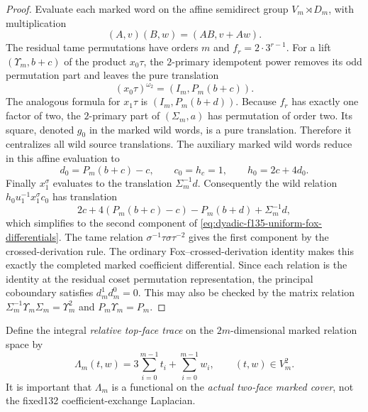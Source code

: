 \begin{proof}
Evaluate each marked
word on the affine
semidirect group
$V_m\rtimes D_m$,
with multiplication
\[
(A,v)(B,w)
=(AB,v+Aw).
\]
The residual tame
permutations have
orders $m$ and
$f_r=2\cdot3^{r-1}$.
For a lift
$(\Upsilon_m,b+c)$
of the product
$x_0\tau$,
the $2$-primary
idempotent power
removes its
odd permutation
part and leaves
the pure translation
\[
(x_0\tau)^{\omega_2}
=(I_m,P_m(b+c)).
\]
The analogous formula
for $x_1\tau$ is
$(I_m,P_m(b+d))$.
Because
$f_r$ has exactly
one factor of two,
the $2$-primary
part of
$(\Sigma_m,a)$
has permutation
of order two.
Its square,
denoted $g_0$ in
the marked wild
words, is a pure
translation.
Therefore it
centralizes all
wild source
translations.
The auxiliary
marked wild words
reduce in this
affine evaluation
to
\[
d_0=P_m(b+c)-c,\qquad
c_0=h_c=1,\qquad
h_0=2c+4d_0.
\]
Finally
$x_1^\sigma$
evaluates to the
translation
$\Sigma_m^{-1}d$.
Consequently the
wild relation
$h_0u_1^{-1}
x_1^\sigma c_0$
has translation
\[
2c+4(P_m(b+c)-c)
-P_m(b+d)+\Sigma_m^{-1}d,
\]
which simplifies
to the second
component of
\eqref{eq:dyadic-f135-uniform-fox-differentials}.
The tame relation
$\sigma^{-1}\tau
\sigma\tau^{-2}$
gives the first
component by the
crossed-derivation
rule.
The ordinary
Fox--crossed-derivation
identity makes this
exactly the
completed marked
coefficient
differential.
Since each relation
is the identity at
the residual coset
permutation
representation,
the principal
coboundary satisfies
$d_m^1d_m^0=0$.
This may also be
checked by the
matrix relation
$\Sigma_m^{-1}
\Upsilon_m\Sigma_m
=\Upsilon_m^2$
and
$P_m\Upsilon_m=P_m$.
\end{proof}

Define the integral
\emph{relative
top-face trace}
on the
$2m$-dimensional
marked relation
space by
\begin{equation}\label{eq:dyadic-f135-uniform-top-face-parity}
\boxed{\quad
\Lambda_m(t,w)
=3\sum_{i=0}^{m-1}t_i
 +\sum_{i=0}^{m-1}w_i,
\qquad (t,w)\in V_m^2 .
\quad}
\end{equation}
It is important
that $\Lambda_m$
is a functional
on the \emph{actual
two-face marked
cover}, not the
fixed132
coefficient-exchange
Laplacian.

